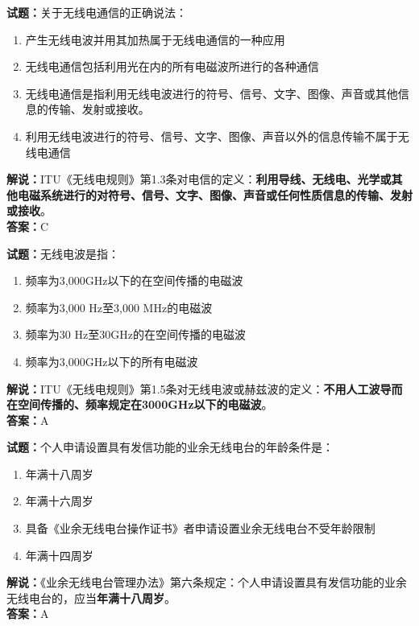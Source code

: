 \documentclass{ctexbook}
\begin{document}
\noindent\textbf{试题：}关于无线电通信的正确说法：
\begin{enumerate}[leftmargin=3em]
\item 产生无线电波并用其加热属于无线电通信的一种应用
\item 无线电通信包括利用光在内的所有电磁波所进行的各种通信
\item 无线电通信是指利用无线电波进行的符号、信号、文字、图像、声音或其他信息的传输、发射或接收。
\item 利用无线电波进行的符号、信号、文字、图像、声音以外的信息传输不属于无线电通信
\end{enumerate}
\noindent\textbf{解说：}ITU《无线电规则》第1.3条对电信的定义：\textbf{利用导线、无线电、光学或其他电磁系统进行的对符号、信号、文字、图像、声音或任何性质信息的传输、发射或接收}。\\\noindent\textbf{答案：}C

\bigskip


\noindent\textbf{试题：}无线电波是指：
\begin{enumerate}[leftmargin=3em]
\item 频率为3,000\unit{\GHz}以下的在空间传播的电磁波
\item 频率为3,000 Hz至3,000 \unit{\MHz}的电磁波
\item 频率为30 Hz至30\unit{\GHz}的在空间传播的电磁波
\item 频率为3,000\unit{\GHz}以下的所有电磁波
\end{enumerate}
\noindent\textbf{解说：}ITU《无线电规则》第1.5条对无线电波或赫兹波的定义：\textbf{不用人工波导而在空间传播的、频率规定在3000\unit{\GHz}以下的电磁波}。\\\noindent\textbf{答案：}A



\bigskip


\noindent\textbf{试题：}个人申请设置具有发信功能的业余无线电台的年龄条件是：
\begin{enumerate}[leftmargin=3em]
\item 年满十八周岁
\item 年满十六周岁
\item 具备《业余无线电台操作证书》者申请设置业余无线电台不受年龄限制
\item 年满十四周岁
\end{enumerate}
\noindent\textbf{解说：}《业余无线电台管理办法》第六条规定：个人申请设置具有发信功能的业余无线电台的，应当\textbf{年满十八周岁}。\\\noindent\textbf{答案：}A
\end{document}
